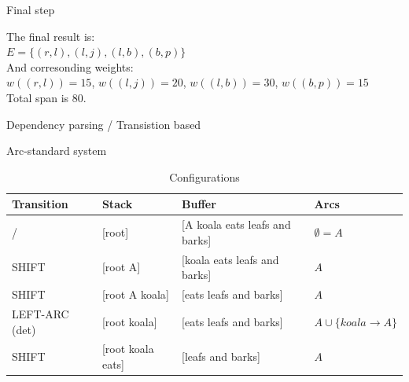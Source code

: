\documentclass[12pt]{article}
\newenvironment{question}[2][Question]{\begin{trivlist}
\item[\hskip \labelsep {\bfseries #1}\hskip \labelsep {\bfseries #2.}]}{\end{trivlist}}
\newenvironment{answer}[2][Answer]{\begin{trivlist}
\item[\hskip \labelsep {\bfseries #1}\hskip \labelsep {\bfseries #2:}]}{\end{trivlist}}
\begin{document}
\begin{answer}{b)}{Final step}

The final result is: \\
$E=\{(r,l),(l,j),(l,b),(b,p)\}$ \\
And corresonding weights: \\
$w((r,l))=15$, $w((l,j))=20$, $w((l,b))=30$, $w((b,p))=15$ \\
Total span is 80.
\end{answer}

\begin{question}{4}
Dependency parsing / Transistion based
\end{question}

\begin{answer}{a)}{Arc-standard system}


\begin{table}[h!]
\centering
\caption{Configurations}
\label{my-label}
\begin{tabular}{|l|l|l|l|}
\hline
Transition       & Stack                       & Buffer                             & Arcs                                                                                                                                          \\ \hline
/                & {[}root{]}                  & {[}A koala eats leafs and barks{]} & $\emptyset=A$                                                                                                                                   \\ \hline
SHIFT            & {[}root A{]}                & {[}koala eats leafs and barks{]}   & $A$                                                                                                                                   \\ \hline
SHIFT            & {[}root A koala{]}          & {[}eats leafs and barks{]}         & $A$                                                                                                                                   \\ \hline
LEFT-ARC (det)   & {[}root koala{]}            & {[}eats leafs and barks{]}         & $A \cup\{koala \to A\}$                                                                                                                             \\ \hline
SHIFT            & {[}root koala eats{]}       & {[}leafs and barks{]}              & $A$                                                                                                                             \\ \hline

\end{tabular}
\end{table}
\end{answer}
\end{document}
